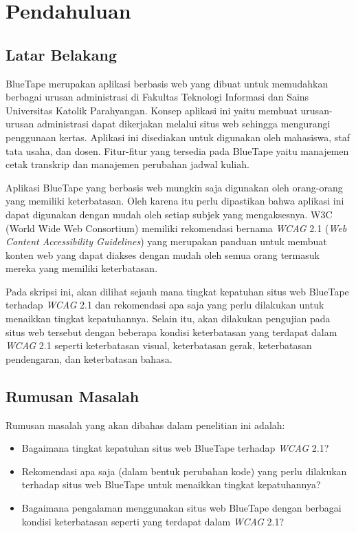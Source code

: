 \chapter{Pendahuluan}
\label{chap:intro}
   
\section{Latar Belakang}
\label{sec:latarbelakang}
BlueTape merupakan aplikasi berbasis web yang dibuat untuk memudahkan berbagai urusan administrasi di Fakultas Teknologi Informasi dan Sains Universitas Katolik Parahyangan. Konsep aplikasi ini yaitu membuat urusan-urusan administrasi dapat dikerjakan melalui situs web sehingga mengurangi penggunaan kertas. Aplikasi ini disediakan untuk digunakan oleh mahasiswa, staf tata usaha, dan dosen. Fitur-fitur yang tersedia pada BlueTape yaitu manajemen cetak transkrip dan manajemen perubahan jadwal kuliah.

Aplikasi BlueTape yang berbasis web mungkin saja digunakan oleh orang-orang yang memiliki keterbatasan. Oleh karena itu perlu dipastikan bahwa aplikasi ini dapat digunakan dengan mudah oleh setiap subjek yang mengaksesnya. W3C (World Wide Web Consortium) memiliki rekomendasi bernama \textit{WCAG} 2.1 (\textit{Web Content Accessibility Guidelines}) yang merupakan panduan untuk membuat konten web yang dapat diakses dengan mudah oleh semua orang termasuk mereka yang memiliki keterbatasan.

Pada skripsi ini, akan dilihat sejauh mana tingkat kepatuhan situs web BlueTape terhadap \textit{WCAG} 2.1 dan rekomendasi apa saja yang perlu dilakukan untuk menaikkan tingkat kepatuhannya. Selain itu, akan dilakukan pengujian pada situs web tersebut dengan beberapa kondisi keterbatasan yang terdapat dalam \textit{WCAG} 2.1 seperti keterbatasan visual, keterbatasan gerak, keterbatasan pendengaran, dan keterbatasan bahasa.

\section{Rumusan Masalah}
\label{sec:rumusan}
Rumusan masalah yang akan dibahas dalam penelitian ini adalah: 
\begin{itemize}
	\item Bagaimana tingkat kepatuhan situs web BlueTape terhadap \textit{WCAG} 2.1?
	\item Rekomendasi apa saja (dalam bentuk perubahan kode) yang perlu dilakukan terhadap situs web BlueTape untuk menaikkan tingkat kepatuhannya?  
	\item Bagaimana pengalaman menggunakan situs web BlueTape dengan berbagai kondisi keterbatasan seperti yang terdapat dalam \textit{WCAG} 2.1?
\end{itemize}

